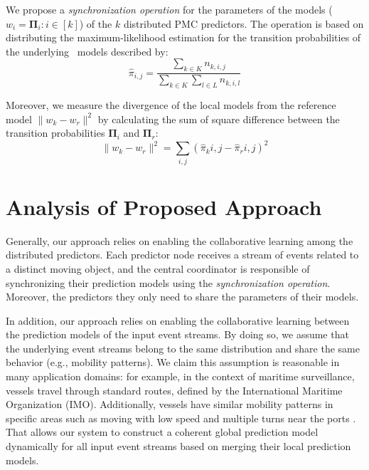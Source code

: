 \par We propose a \textit{synchronization operation} for the parameters of the models ($w_i=\boldsymbol{\Pi}_i :i \in[k]$) of the $k$ distributed PMC predictors. The operation is based on distributing the maximum-likelihood estimation \cite{anderson1957statistical} for the transition probabilities of the underlying \pmcmr\ models described by: 
\begin{equation}
\label{eq:dis_pi_estim}
\hat{\pi}_{i,j}=\frac{\sum_{k \in K} n_{k,i,j}}{\sum_{k \in K} \sum_{l \in L} n_{k,i,l}}
\end{equation}

\par Moreover, we measure the divergence of the local models from the reference model  $\|w_k - w_r\|^2$ by calculating the sum of square difference between the transition probabilities  $\boldsymbol{\Pi}_i$ and  $\boldsymbol{\Pi}_r$:
\begin{equation*}
\label{eq:dis_pi_varinace}
\|w_k - w_r\|^2=\sum_{i,j} (\hat{\pi}_k{i,j} -\hat{\pi}_r{i,j})^2
\end{equation*}

\section{Analysis of Proposed Approach}

\par Generally, our approach relies on enabling the collaborative learning among the distributed predictors. Each predictor node receives a stream of events related to a distinct moving object, and the central coordinator is responsible of synchronizing their prediction models using the \textit{synchronization operation}. Moreover, the predictors they only need to share the parameters of their models. 

\par In addition, our approach relies on enabling the collaborative learning between the prediction models of  the input event streams. By doing so, we assume that the underlying event streams belong to the same  distribution and share the same behavior (e.g., mobility patterns). We claim this assumption is reasonable in many application domains: for example, in the context of maritime surveillance, vessels travel through standard routes, defined by the International Maritime Organization (IMO). Additionally, vessels have similar mobility patterns in specific areas such as moving with low speed and multiple turns near the ports \cite{pallotta2013vessel,liu2014knowledge}. That allows our system to construct a coherent global prediction model dynamically for all input event streams based on merging their local prediction models.



